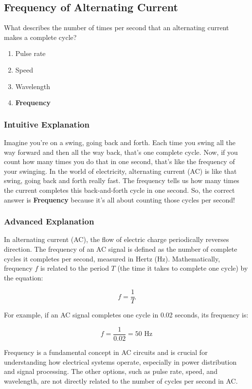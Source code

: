 \subsection{Frequency of Alternating Current}
\label{T5A12}

\begin{tcolorbox}[colback=gray!10!white,colframe=black!75!black,title=T5A12]
What describes the number of times per second that an alternating current makes a complete cycle?
\begin{enumerate}[label=\Alph*)]
    \item Pulse rate
    \item Speed
    \item Wavelength
    \item \textbf{Frequency}
\end{enumerate}
\end{tcolorbox}

\subsubsection{Intuitive Explanation}
Imagine you're on a swing, going back and forth. Each time you swing all the way forward and then all the way back, that's one complete cycle. Now, if you count how many times you do that in one second, that's like the frequency of your swinging. In the world of electricity, alternating current (AC) is like that swing, going back and forth really fast. The frequency tells us how many times the current completes this back-and-forth cycle in one second. So, the correct answer is \textbf{Frequency} because it’s all about counting those cycles per second!

\subsubsection{Advanced Explanation}
In alternating current (AC), the flow of electric charge periodically reverses direction. The frequency of an AC signal is defined as the number of complete cycles it completes per second, measured in Hertz (Hz). Mathematically, frequency \( f \) is related to the period \( T \) (the time it takes to complete one cycle) by the equation:

\[
f = \frac{1}{T}
\]

For example, if an AC signal completes one cycle in 0.02 seconds, its frequency is:

\[
f = \frac{1}{0.02} = 50 \text{ Hz}
\]

Frequency is a fundamental concept in AC circuits and is crucial for understanding how electrical systems operate, especially in power distribution and signal processing. The other options, such as pulse rate, speed, and wavelength, are not directly related to the number of cycles per second in AC.

